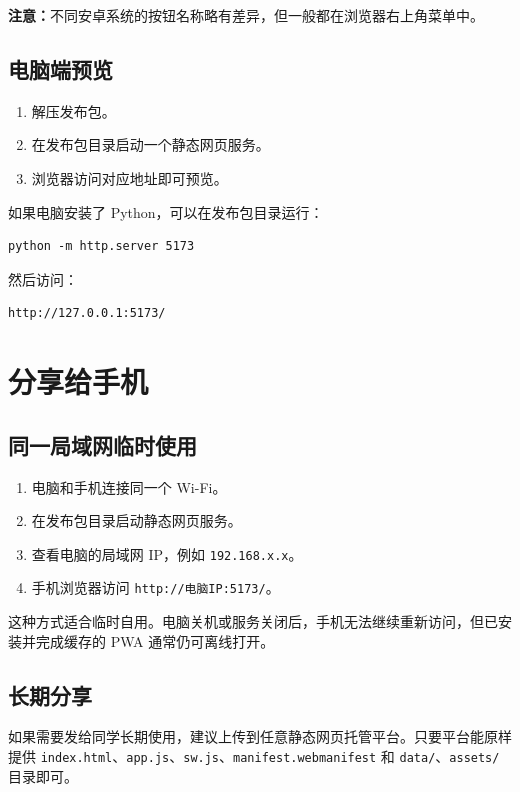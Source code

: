 \documentclass[11pt,a4paper]{ctexart}
\begin{document}
\textbf{注意：}不同安卓系统的按钮名称略有差异，但一般都在浏览器右上角菜单中。

\subsection{电脑端预览}
\begin{enumerate}
  \item 解压发布包。
  \item 在发布包目录启动一个静态网页服务。
  \item 浏览器访问对应地址即可预览。
\end{enumerate}

如果电脑安装了 Python，可以在发布包目录运行：

\begin{verbatim}
python -m http.server 5173
\end{verbatim}

然后访问：

\begin{verbatim}
http://127.0.0.1:5173/
\end{verbatim}

\section{分享给手机}

\subsection{同一局域网临时使用}
\begin{enumerate}
  \item 电脑和手机连接同一个 Wi-Fi。
  \item 在发布包目录启动静态网页服务。
  \item 查看电脑的局域网 IP，例如 \texttt{192.168.x.x}。
  \item 手机浏览器访问 \texttt{http://电脑IP:5173/}。
\end{enumerate}

这种方式适合临时自用。电脑关机或服务关闭后，手机无法继续重新访问，但已安装并完成缓存的 PWA 通常仍可离线打开。

\subsection{长期分享}

如果需要发给同学长期使用，建议上传到任意静态网页托管平台。只要平台能原样提供 \texttt{index.html}、\texttt{app.js}、\texttt{sw.js}、\texttt{manifest.webmanifest} 和 \texttt{data/}、\texttt{assets/} 目录即可。
\end{document}
